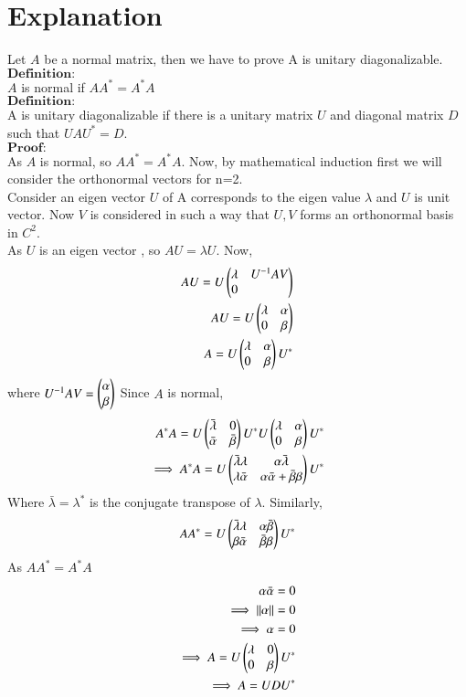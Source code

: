 \documentclass[journal,12pt,twocolumn]{IEEEtran}
\begin{document}
\section{Explanation}
Let $A$ be a normal matrix, then we have to prove A is unitary diagonalizable.\\
$\textbf{Definition:}$\\
$A$ is normal if $A A^* = A^* A$\\
$\textbf{Definition:}$\\
A is unitary diagonalizable if there is a unitary matrix $U$ and diagonal matrix $D$ such that $UAU^* = D$.\\
$\textbf{Proof:}$\\
As $A$ is normal, so $A A^* = A^* A$. Now, by mathematical induction first we will consider the orthonormal vectors for n=2.\\
Consider an eigen vector $U$ of A corresponds to the eigen value $\lambda$ and $U$ is unit vector. Now $V$ is considered in such a way that ${U, V}$ forms an orthonormal basis in $C^2$.\\
As $U$ is an eigen vector , so $AU=\lambda U$.
Now,
\begin{align}
AU = U \begin{pmatrix}\lambda & U^{-1}AV\\0\end{pmatrix}\\
AU = U \begin{pmatrix}\lambda & \alpha\\0 & \beta\end{pmatrix}\\
A = U \begin{pmatrix}\lambda & \alpha\\0 & \beta\end{pmatrix} U^*
\end{align}
where $U^{-1}AV = \begin{pmatrix}\alpha\\\beta\end{pmatrix}$
Since $A$ is normal, 
\begin{align}
A^* A = U \begin{pmatrix}\bar{\lambda} & 0\\\bar{\alpha} & \bar{\beta}\end{pmatrix} U^* U \begin{pmatrix}\lambda & \alpha\\0 & \beta\end{pmatrix} U^*\\
\implies A^* A = U \begin{pmatrix}\bar{\lambda}\lambda & \alpha\bar{\lambda}\\\lambda\bar{\alpha} & \alpha\bar{\alpha}+\bar{\beta}\beta\end{pmatrix}U^*
\end{align}
Where $\bar{\lambda} = \lambda ^*$ is the conjugate transpose of $\lambda$.
Similarly,
\begin{align}
A A^* =  U \begin{pmatrix}\bar{\lambda}\lambda & \alpha\bar{\beta}\\\beta\bar{\alpha} & \bar{\beta}\beta\end{pmatrix}U^*
\end{align}
As $A A^* = A^* A$
\begin{align}
\alpha\bar{\alpha} = 0\\
\implies \left\lVert\alpha\right\rVert = 0\\
\implies \alpha =0\\
\implies A = U \begin{pmatrix}\lambda & 0\\0 & \beta\end{pmatrix} U^*\\
\implies A = U D U^*
\end{align}
\end{document}
